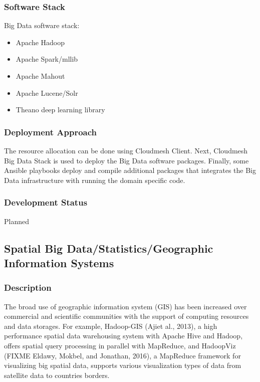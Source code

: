 \documentclass[9pt,twocolumn,twoside]{styles/osajnl}
\begin{document}
\subsubsection{Software Stack}

Big Data software stack:

\begin{itemize}
\item Apache Hadoop
\item Apache Spark/mllib
\item Apache Mahout
\item Apache Lucene/Solr
\item Theano deep learning library
\end{itemize}

\subsubsection{Deployment Approach}

The resource allocation can be done using Cloudmesh Client.  Next,
Cloudmesh Big Data Stack is used to deploy the Big Data software
packages.  Finally, some Ansible playbooks deploy and compile
additional packages that integrates the Big Data infrastructure with
running the domain specific code.

\subsubsection{Development Status}

Planned


\subsection{Spatial Big Data/Statistics/Geographic Information Systems}

\subsubsection{Description}

The broad use of geographic information system (GIS) has been
increased over commercial and scientific communities with the support
of computing resources and data storages. For example, Hadoop-GIS
(Ajiet al., 2013), a high performance spatial data warehousing system
with Apache Hive and Hadoop, offers spatial query processing in
parallel with MapReduce, and HadoopViz (FIXME Eldawy, Mokbel, and Jonathan,
2016), a MapReduce framework for visualizing big spatial data,
supports various visualization types of data from satellite data to
countries borders.
\end{document}
